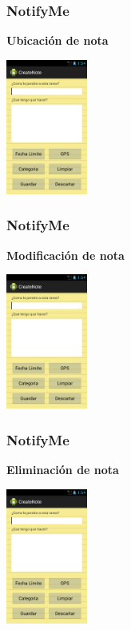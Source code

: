 \documentclass[9pt]{beamer}
\begin{document}
	\begin{frame}
		\frametitle{NotifyMe}
			\begin{block}{\textbf{Ubicación de nota}}
				\begin{center}
					\includegraphics[width=0.20\textwidth]{crearnota.png}

				\end{center}
			 \end{block}
	\end{frame}	
	
	
	\begin{frame}
		\frametitle{NotifyMe}
			\begin{block}{\textbf{Modificación de nota}}
				\begin{center}
					\includegraphics[width=0.20\textwidth]{crearnota.png}

				\end{center}
			 \end{block}
	\end{frame}	
	
	\begin{frame}
		\frametitle{NotifyMe}
		\begin{block}{\textbf{Eliminación de nota}}
			\begin{center}
				\includegraphics[width=0.20\textwidth]{crearnota.png}
			\end{center}
		 \end{block}
	\end{frame}
		
\end{document}

